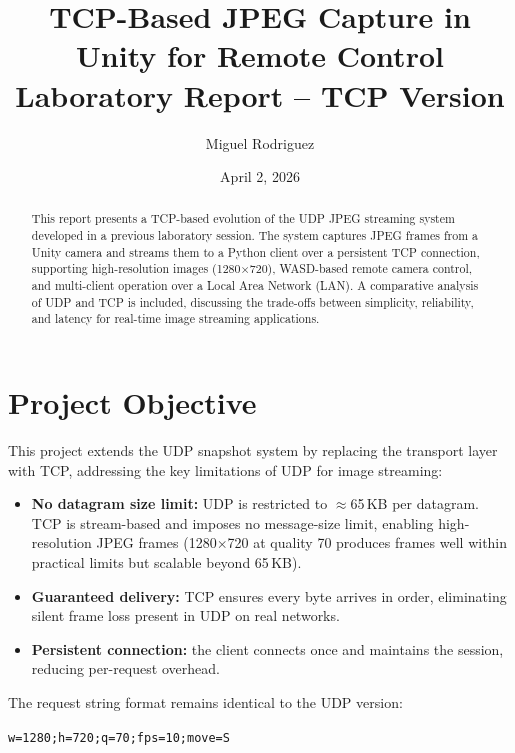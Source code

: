 \documentclass[12pt,a4paper]{article}
\title{
    \vspace{-1cm}
    \Large\textbf{TCP-Based JPEG Capture in Unity for Remote Control}\\[0.5em]
    \large Laboratory Report -- TCP Version
}
\author{Miguel Rodriguez}
\date{April 2, 2026}
\begin{document}
\maketitle
\thispagestyle{fancy}

\begin{abstract}
This report presents a TCP-based evolution of the UDP JPEG streaming system developed
in a previous laboratory session. The system captures JPEG frames from a Unity camera
and streams them to a Python client over a persistent TCP connection, supporting
high-resolution images (1280$\times$720), WASD-based remote camera control, and
multi-client operation over a Local Area Network (LAN). A comparative analysis of UDP
and TCP is included, discussing the trade-offs between simplicity, reliability,
and latency for real-time image streaming applications.
\end{abstract}

\tableofcontents
\newpage

\section{Project Objective}

This project extends the UDP snapshot system by replacing the transport layer with TCP,
addressing the key limitations of UDP for image streaming:

\begin{itemize}
    \item \textbf{No datagram size limit:} UDP is restricted to $\approx$65\,KB per
          datagram. TCP is stream-based and imposes no message-size limit, enabling
          high-resolution JPEG frames (1280$\times$720 at quality 70 produces frames
          well within practical limits but scalable beyond 65\,KB).
    \item \textbf{Guaranteed delivery:} TCP ensures every byte arrives in order,
          eliminating silent frame loss present in UDP on real networks.
    \item \textbf{Persistent connection:} the client connects once and maintains the
          session, reducing per-request overhead.
\end{itemize}

The request string format remains identical to the UDP version:
\begin{center}
\texttt{w=1280;h=720;q=70;fps=10;move=S}
\end{center}
\end{document}
